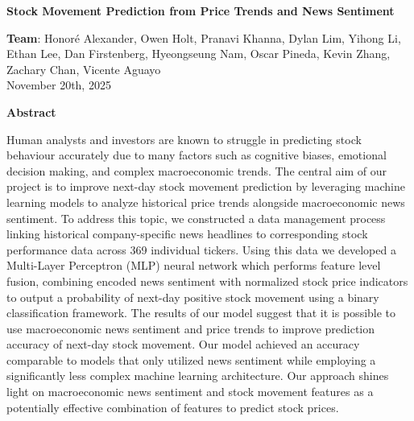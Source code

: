 \documentclass[letterpaper,12pt, twocolumn]{report}
\begin{document}
\begin{titlepage}
    \begin{center}
        \LARGE
        \textbf{Stock Movement Prediction from Price Trends and News Sentiment}


        \normalsize

        \vspace{40pt}
        \textbf{Team}: Honoré Alexander, Owen Holt, Pranavi Khanna,  Dylan Lim, Yihong Li, Ethan Lee, Dan Firstenberg, Hyeongseung Nam, Oscar Pineda, Kevin Zhang, Zachary Chan, Vicente Aguayo\\

        \vspace{25pt}
        November 20th, 2025
    
        \vspace{40pt}
        \textbf{Abstract} \\
        \vspace{10pt}

    \end{center}
        \raggedright
Human analysts and investors are known to struggle in predicting stock behaviour accurately due to many factors such as cognitive biases, emotional decision making, and complex macroeconomic trends. The central aim of our project is to improve next-day stock movement prediction by leveraging machine learning models to analyze historical price trends alongside macroeconomic news sentiment. To address this topic, we constructed a data management process linking historical company-specific news headlines to corresponding stock performance data across 369 individual tickers. Using this data we developed a Multi-Layer Perceptron (MLP) neural network which performs feature level fusion, combining encoded news sentiment with normalized stock price indicators to output a probability of next-day positive stock movement using a binary classification framework. The results of our model suggest that it is possible to use macroeconomic news sentiment and price trends to improve prediction accuracy of next-day stock movement. Our model achieved an accuracy comparable to models that only utilized news sentiment while employing a significantly less complex machine learning architecture. Our approach shines light on macroeconomic news sentiment and stock movement features as a potentially effective combination of features to predict stock prices.

  

\vfill





\end{titlepage}
\end{document}
